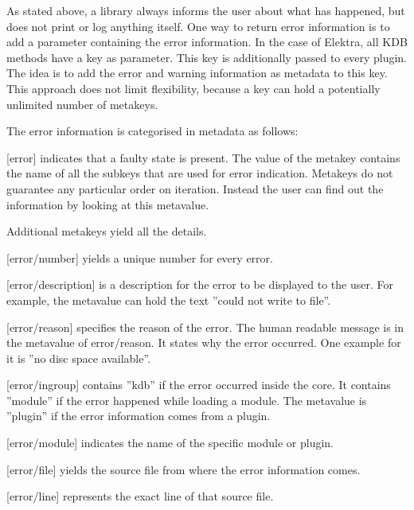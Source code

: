 As stated above, a library always informs the user about what has happened, but does not print or log anything itself. One way to return error information is to add a parameter containing the error information. In the case of Elektra, all {\ttfamily K\+D\+B} methods have a key as parameter. This key is additionally passed to every plugin. The idea is to add the error and warning information as metadata to this key. This approach does not limit flexibility, because a key can hold a potentially unlimited number of metakeys.

The error information is categorised in metadata as follows\+:


\begin{DoxyItemize}
\item \mbox{[}error\mbox{]} indicates that a faulty state is present. The value of the metakey contains the name of all the subkeys that are used for error indication. Metakeys do not guarantee any particular order on iteration. Instead the user can find out the information by looking at this metavalue.
\end{DoxyItemize}

Additional metakeys yield all the details.


\begin{DoxyItemize}
\item \mbox{[}error/number\mbox{]} yields a unique number for every error.
\item \mbox{[}error/description\mbox{]} is a description for the error to be displayed to the user. For example, the metavalue can hold the text ''could not write to file''.
\item \mbox{[}error/reason\mbox{]} specifies the reason of the error. The human readable message is in the metavalue of {\ttfamily error/reason}. It states why the error occurred. One example for it is ''no disc space available''.
\item \mbox{[}error/ingroup\mbox{]} contains ''{\ttfamily kdb}'' if the error occurred inside the core. It contains ''{\ttfamily module}'' if the error happened while loading a module. The metavalue is ''{\ttfamily plugin}'' if the error information comes from a plugin.
\item \mbox{[}error/module\mbox{]} indicates the name of the specific module or plugin.
\item \mbox{[}error/file\mbox{]} yields the source file from where the error information comes.
\item \mbox{[}error/line\mbox{]} represents the exact line of that source file.
\end{DoxyItemize}

